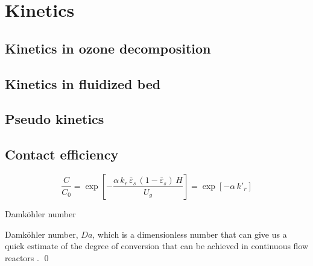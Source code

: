 \chapter{Kinetics}
\section{Kinetics in ozone decomposition}

\section{Kinetics in fluidized bed}

\section{Pseudo kinetics}

\section{Contact efficiency}

\begin{equation}
    \frac{C}{C_0} 
    = \exp\left[ 
        -\frac{\alpha\,k_r\,\bar{\varepsilon}_s\, (1-\bar{\varepsilon}_s)\,H}{U_g} 
        \right]
    = \exp\left[ -\alpha\,k'_r \right]
\end{equation}

\begin{definition}
    Damköhler number

    Damköhler number, $Da$, which is a dimensionless number that can give us a quick estimate of the degree of conversion that can be achieved in continuous flow reactors \citep{fogler2016element}.
    \qed
\end{definition}
